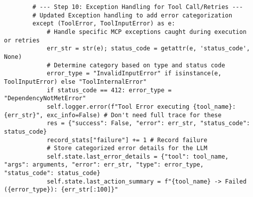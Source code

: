 \documentclass[12pt,a4paper]{article}
\begin{document}
\begin{pageablecode}
\begin{verbatim}
        # --- Step 10: Exception Handling for Tool Call/Retries ---
        # Updated Exception handling to add error categorization
        except (ToolError, ToolInputError) as e:
            # Handle specific MCP exceptions caught during execution or retries
            err_str = str(e); status_code = getattr(e, 'status_code', None)
            # Determine category based on type and status code
            error_type = "InvalidInputError" if isinstance(e, ToolInputError) else "ToolInternalError"
            if status_code == 412: error_type = "DependencyNotMetError"
            self.logger.error(f"Tool Error executing {tool_name}: {err_str}", exc_info=False) # Don't need full trace for these
            res = {"success": False, "error": err_str, "status_code": status_code}
            record_stats["failure"] += 1 # Record failure
            # Store categorized error details for the LLM
            self.state.last_error_details = {"tool": tool_name, "args": arguments, "error": err_str, "type": error_type, "status_code": status_code}
            self.state.last_action_summary = f"{tool_name} -> Failed ({error_type}): {err_str[:100]}"


\end{verbatim}
\end{pageablecode}
\end{document}
